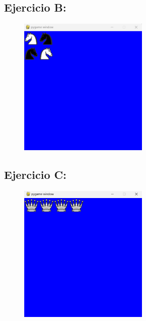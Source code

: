 \documentclass{article}
\begin{document}
	\subsection{Ejercicio B:}
	
	\begin{figure}[H]
		\centering
		\includegraphics[width=0.55\textwidth,keepaspectratio]{img/Picture B.png}
	\end{figure}	
	
	\subsection{Ejercicio C:}
	
	\begin{figure}[H]
		\centering
		\includegraphics[width=0.55\textwidth,keepaspectratio]{img/Picture C.png}
	\end{figure}	
	
\end{document}

